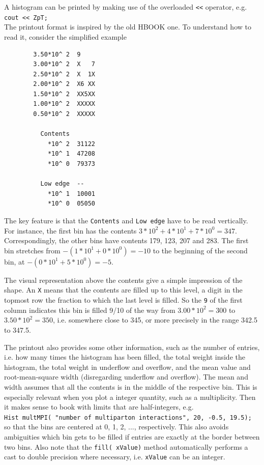 \documentclass[12pt,a4paper]{article}
\begin{document}
A histogram can be printed by making use of the overloaded 
\texttt{<<} operator, e.g.\\
\hspace*{10mm}\texttt{cout << ZpT;}\\
The printout format is inspired by the old HBOOK one. To understand 
how to read it, consider the simplified example
\begin{verbatim}                                   
        3.50*10^ 2  9                     
        3.00*10^ 2  X   7               
        2.50*10^ 2  X  1X               
        2.00*10^ 2  X6 XX                
        1.50*10^ 2  XX5XX                 
        1.00*10^ 2  XXXXX                
        0.50*10^ 2  XXXXX        

          Contents 
            *10^ 2  31122
            *10^ 1  47208
            *10^ 0  79373

          Low edge  -- 
            *10^ 1  10001 
            *10^ 0  05050
\end{verbatim}
The key feature is that the \texttt{Contents} and \texttt{Low edge} 
have to be read vertically. For instance, the first bin has the 
contents $3 * 10^2 + 4 * 10^1 + 7 * 10^0 = 347$. Correspondingly, 
the other bins have contents 179, 123, 207 and 283. The first bin 
stretches from $-(1 * 10^1 + 0 * 10^0) = -10$ to the beginning 
of the second bin, at $-(0 * 10^1 + 5 * 10^0) = -5$.

The visual representation above the contents give a simple impression 
of the shape. An \texttt{X} means that the contents are filled up to 
this level, a digit in the topmost row the fraction to which the last 
level is filled. So the \texttt{9} of the first column indicates this 
bin is filled 9/10 of the way from $3.00*10^2 = 300$ to 
$3.50*10^2 = 350$, i.e. somewhere close to 345, or more precisely 
in the range 342.5 to 347.5.

The printout also provides some other information, such as the number 
of entries, i.e. how many times the histogram has been filled, the total 
weight inside the histogram, the total weight in underflow and overflow, 
and the mean value and root-mean-square width (disregarding underflow 
and overflow). The mean and width assumes that all the contents is in 
the middle of the respective bin. This is especially relevant when you 
plot a integer quantity, such as a multiplicity. Then it makes sense 
to book with limits that are half-integers, e.g.\\
\hspace*{10mm}\texttt{Hist multMPI( "number of multiparton interactions", %
20, -0.5, 19.5);}\\
so that the bins are centered at 0, 1, 2, ..., respectively. This also 
avoids ambiguities which bin gets to be filled if entries are exactly 
at the border between two bins. Also note that the \texttt{fill( xValue)} 
method automatically performs a cast to double precision where necessary, 
i.e. \texttt{xValue} can be an integer.
\end{document}
